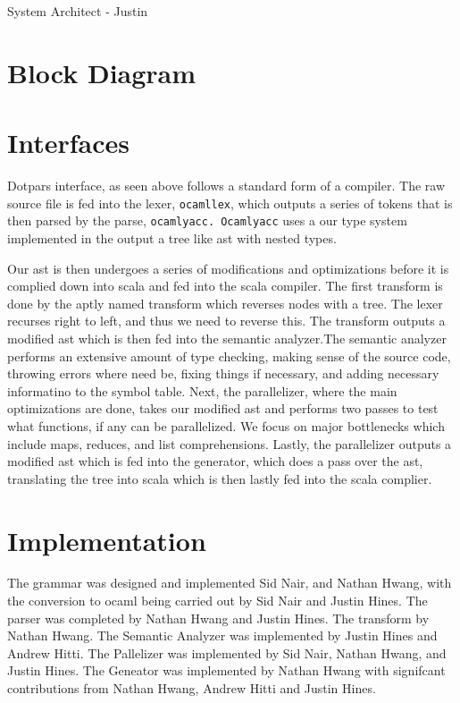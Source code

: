 System Architect - Justin
\section{Block Diagram}


\section{Interfaces}
Dotpars interface, as seen above follows a standard form of a compiler. The raw
source file is fed into the lexer, \verb=ocamllex=, which outputs a series of tokens that is then
parsed by the parse, \verb=ocamlyacc. Ocamlyacc= uses a our type system implemented in
the output a tree like ast with nested types. 

Our ast is then undergoes a series of modifications and optimizations before it
is complied down into scala and fed into the scala compiler.  The first transform
is done by the aptly named transform which reverses nodes with a tree.  The lexer recurses right to left, and thus we need to reverse this.  The transform outputs
a modified ast which is then fed into the semantic analyzer.The semantic analyzer 
performs an extensive amount of type checking, making sense of the source code, 
throwing errors where need be, fixing things if necessary, and adding necessary 
informatino to the symbol table.  Next, the parallelizer, where the main optimizations
are done, takes our modified ast and performs two passes to test what functions, 
if any can be parallelized. We focus on major bottlenecks which include maps, reduces,
and list comprehensions. Lastly, the parallelizer outputs a modified ast which is fed
into the generator, which does a pass over the ast, translating the tree into 
scala which is then lastly fed into the scala complier.

\section{Implementation}
The grammar was designed and implemented Sid Nair, and Nathan Hwang, with the
conversion to ocaml being carried out by Sid Nair and Justin Hines.  The parser was
completed by Nathan Hwang and Justin Hines.  The transform by Nathan Hwang.  The
Semantic Analyzer was implemented by Justin Hines and Andrew Hitti.  The Pallelizer was
implemented by Sid Nair, Nathan Hwang, and Justin Hines. The Geneator was 
implemented by Nathan Hwang with signifcant contributions from Nathan Hwang, 
Andrew Hitti and Justin Hines.





